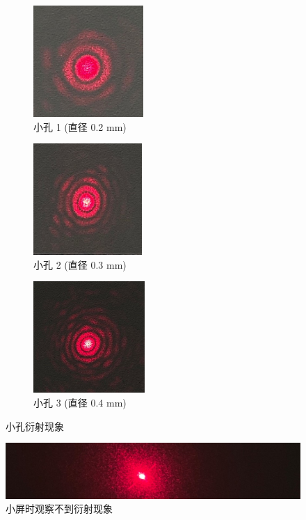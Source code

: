 \documentclass[UTF8]{article}
\theoremstyle{MyLineTheoremStyle} %
\theoremstyle{MyBlockTheoremStyle} %
\theoremstyle{MySubsubsectionStyle} %
\begin{document}
\begin{figure}[H]\centering
\begin{subfigure}[b]{0.33\columnwidth}\centering
    \includegraphics[height=120pt]{assets/4 衍射实验/小孔 1.jpg}
    \caption{小孔 1 (直径 0.2 mm)}
\end{subfigure}\hfill
\begin{subfigure}[b]{0.33\columnwidth}\centering
    \includegraphics[height=120pt]{assets/4 衍射实验/小孔 2.jpg}
    \caption{小孔 2 (直径 0.3 mm)}
\end{subfigure}
\begin{subfigure}[b]{0.33\columnwidth}\centering
    \includegraphics[height=120pt]{assets/4 衍射实验/小孔 3.jpg}
    \caption{小孔 3 (直径 0.4 mm)}
\end{subfigure}
\caption{小孔衍射现象}
\end{figure}

\begin{figure}[H]\centering
    \includegraphics[width=0.7\columnwidth]{assets/4 衍射实验/圆点.jpg}
    \caption{小屏时观察不到衍射现象}\label{小孔衍射现象}
\end{figure}
\end{document}
